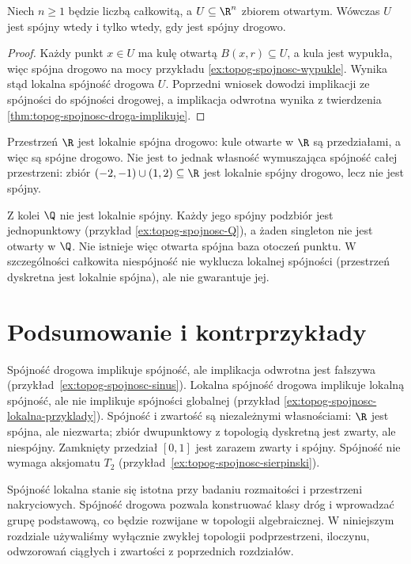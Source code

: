 \begin{wniosek}
\label{cor:topog-spojnosc-euklidesowe}
Niech $n\ge1$ będzie liczbą całkowitą,
a $U\subseteq\R^n$ zbiorem otwartym.
Wówczas $U$ jest spójny wtedy i tylko wtedy,
gdy jest spójny drogowo.
\end{wniosek}
\begin{proof}
Każdy punkt $x\in U$ ma kulę otwartą
$B(x,r)\subseteq U$, a kula jest wypukła,
więc spójna drogowo na mocy przykładu
\ref{ex:topog-spojnosc-wypukle}.
Wynika stąd lokalna spójność drogowa $U$.
Poprzedni wniosek dowodzi implikacji
ze spójności do spójności drogowej,
a implikacja odwrotna wynika z twierdzenia
\ref{thm:topog-spojnosc-droga-implikuje}.
\end{proof}

\begin{przyklad}
\label{ex:topog-spojnosc-lokalna-przyklady}
Przestrzeń $\R$ jest lokalnie spójna drogowo:
kule otwarte w $\R$ są przedziałami,
a więc są spójne drogowo. Nie jest to
jednak własność wymuszająca spójność
całej przestrzeni: zbiór
$(-2,-1)\cup(1,2)\subseteq\R$ jest lokalnie
spójny drogowo, lecz nie jest spójny.

Z kolei $\Q$ nie jest lokalnie spójny.
Każdy jego spójny podzbiór jest
jednopunktowy (przykład
\ref{ex:topog-spojnosc-Q}), a żaden
singleton nie jest otwarty w $\Q$.
Nie istnieje więc otwarta spójna baza
otoczeń punktu. W szczególności
całkowita niespójność nie wyklucza
lokalnej spójności (przestrzeń dyskretna
jest lokalnie spójna), ale nie gwarantuje jej.
\end{przyklad}

\section{Podsumowanie i kontrprzykłady}
\label{sec:topog-spojnosc-podsumowanie}

\begin{uwaga}
\label{rem:topog-spojnosc-hierarchia}
Spójność drogowa implikuje spójność,
ale implikacja odwrotna jest fałszywa
(przykład~\ref{ex:topog-spojnosc-sinus}).
Lokalna spójność drogowa implikuje lokalną
spójność, ale nie implikuje spójności
globalnej (przykład
\ref{ex:topog-spojnosc-lokalna-przyklady}).
Spójność i zwartość są niezależnymi
własnościami: $\R$ jest spójna,
ale niezwarta; zbiór dwupunktowy z
topologią dyskretną jest zwarty,
ale niespójny. Zamknięty przedział
$[0,1]$ jest zarazem zwarty i spójny.
Spójność nie wymaga aksjomatu $T_2$
(przykład~\ref{ex:topog-spojnosc-sierpinski}).
\end{uwaga}

\begin{uwaga}
\label{rem:topog-spojnosc-dalsze}
Spójność lokalna stanie się istotna
przy badaniu rozmaitości i przestrzeni
nakryciowych. Spójność drogowa pozwala
konstruować klasy dróg i wprowadzać
grupę podstawową, co będzie rozwijane
w topologii algebraicznej. W niniejszym
rozdziale używaliśmy wyłącznie zwykłej
topologii podprzestrzeni, iloczynu,
odwzorowań ciągłych i zwartości
z poprzednich rozdziałów.
\end{uwaga}
